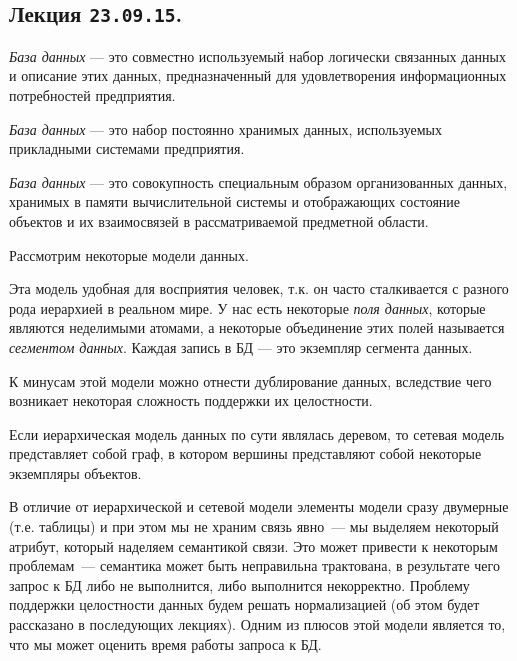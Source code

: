 \subsection{%
  Лекция \texttt{23.09.15}.%
}

\begin{definition}
  \textit{База данных} --- это совместно используемый набор логически связанных 
  данных и описание этих данных, предназначенный для удовлетворения информационных
  потребностей предприятия.
\end{definition}

\begin{definition}[по Дейту]
  \textit{База данных} --- это набор постоянно хранимых данных, используемых 
  прикладными системами предприятия.
\end{definition}

\begin{definition}[по Хомоненко]
  \textit{База данных} --- это совокупность специальным образом организованных данных,
  хранимых в памяти вычислительной системы и отображающих состояние объектов и
  их взаимосвязей в рассматриваемой предметной области.
\end{definition}

Рассмотрим некоторые модели данных.


Эта модель удобная для восприятия человек, т.к. он часто сталкивается с
разного рода иерархией в реальном мире. У нас есть некоторые \textit{поля данных},
которые являются неделимыми атомами, а некоторые объединение этих полей
называется \textit{сегментом данных}.
Каждая запись в БД --- это экземпляр сегмента данных.

К минусам этой модели можно отнести дублирование данных, вследствие чего
возникает некоторая сложность поддержки их целостности.


Если иерархическая модель данных по сути являлась деревом, то сетевая модель
представляет собой граф, в котором вершины представляют собой некоторые
экземпляры объектов.


В отличие от иерархической и сетевой модели элементы модели сразу двумерные
(т.е. таблицы) и при этом мы не храним связь явно~--- мы выделяем некоторый
атрибут, который наделяем семантикой связи. Это может привести к некоторым
проблемам~--- семантика может быть неправильна трактована, в результате чего
запрос к БД либо не выполнится, либо выполнится некорректно. Проблему поддержки
целостности данных будем решать нормализацией (об этом будет рассказано в
последующих лекциях). Одним из плюсов этой модели является то, что мы может
оценить время работы запроса к БД.

